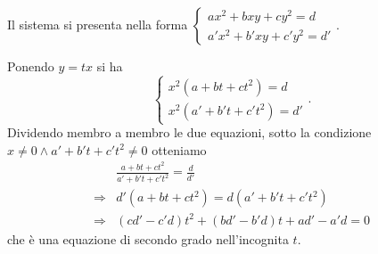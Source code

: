 Il sistema si presenta nella forma \(\left\{\begin{array}{l}{{ax}^2+{bxy}+{cy}^2=d}\\{a'x^2+b'{xy}+c'y^2=d'}\end{array}\right.\).

Ponendo \(y=tx\) si ha 
\[\left\{\begin{array}{l}{x^2(a+{bt}+{ct}^2)=d}\\{x^2(a'+b't+c't^2)=d'}\end{array}\right..\]
Dividendo membro a membro le due equazioni, sotto la condizione \(x\neq 0\wedge a'+b't+c't^2\neq 0\) otteniamo 
\begin{align*}
&\frac{a+{bt}+{ct}^2}{a'+b't+c't^2}=\frac d{d'}\\
\Rightarrow & d'(a+{bt}+{ct}^2)=d(a'+b't+c't^2)\\
\Rightarrow & ({cd}'-c'd)t^2+({bd}'-b'd)t+{ad}'-a'd=0 
\end{align*}
che è una equazione di secondo grado nell'incognita \(t\).

